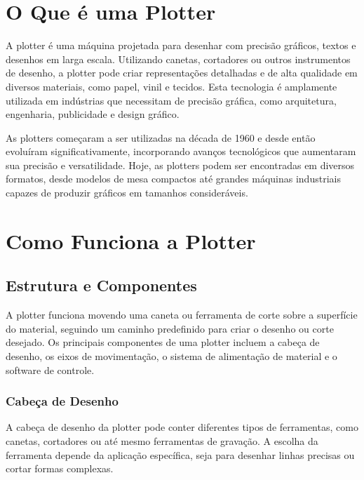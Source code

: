 \documentclass[
]{book}
\begin{document}
\section{O Que é uma Plotter}\label{o-que-uxe9-uma-plotter}

A plotter é uma máquina projetada para desenhar com precisão gráficos, textos e desenhos em larga escala. Utilizando canetas, cortadores ou outros instrumentos de desenho, a plotter pode criar representações detalhadas e de alta qualidade em diversos materiais, como papel, vinil e tecidos. Esta tecnologia é amplamente utilizada em indústrias que necessitam de precisão gráfica, como arquitetura, engenharia, publicidade e design gráfico.

As plotters começaram a ser utilizadas na década de 1960 e desde então evoluíram significativamente, incorporando avanços tecnológicos que aumentaram sua precisão e versatilidade. Hoje, as plotters podem ser encontradas em diversos formatos, desde modelos de mesa compactos até grandes máquinas industriais capazes de produzir gráficos em tamanhos consideráveis.

\section{Como Funciona a Plotter}\label{como-funciona-a-plotter}

\subsection{Estrutura e Componentes}\label{estrutura-e-componentes-2}

A plotter funciona movendo uma caneta ou ferramenta de corte sobre a superfície do material, seguindo um caminho predefinido para criar o desenho ou corte desejado. Os principais componentes de uma plotter incluem a cabeça de desenho, os eixos de movimentação, o sistema de alimentação de material e o software de controle.

\subsubsection{Cabeça de Desenho}\label{cabeuxe7a-de-desenho}

A cabeça de desenho da plotter pode conter diferentes tipos de ferramentas, como canetas, cortadores ou até mesmo ferramentas de gravação. A escolha da ferramenta depende da aplicação específica, seja para desenhar linhas precisas ou cortar formas complexas.
\end{document}
